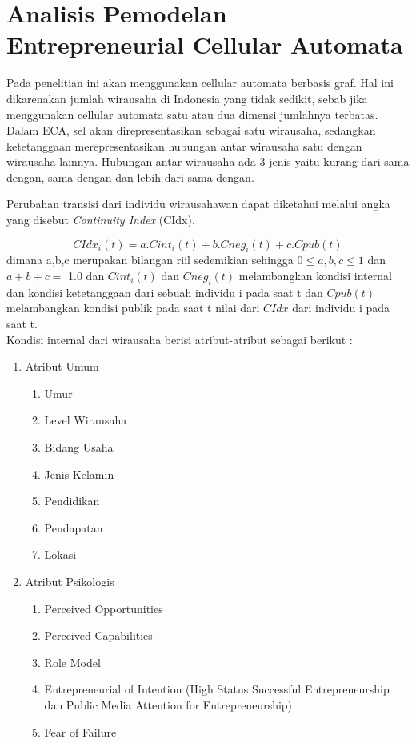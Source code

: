 \section{Analisis Pemodelan Entrepreneurial Cellular Automata}
\label{analisisCA}
Pada penelitian ini akan menggunakan cellular automata berbasis graf. Hal ini dikarenakan jumlah wirausaha di Indonesia yang tidak sedikit, sebab jika menggunakan cellular automata satu atau dua dimensi jumlahnya terbatas.\\
Dalam ECA, sel akan direpresentasikan sebagai satu wirausaha, sedangkan ketetanggaan merepresentasikan hubungan antar wirausaha satu dengan wirausaha lainnya. Hubungan antar wirausaha ada 3 jenis yaitu kurang dari sama dengan, sama dengan dan lebih dari sama dengan.


Perubahan transisi dari individu wirausahawan dapat diketahui melalui angka yang disebut \textit{Continuity Index} (CIdx).

\begin{displaymath}
\label{RumusCIDx}
	CIdx_{i}(t) = a.Cint_{i}(t) + b.Cneg_{i}(t) + c.Cpub(t)
\end{displaymath}
dimana a,b,c merupakan bilangan riil sedemikian sehingga $0\leq a,b,c \leq 1$ dan $a+b+c=$ 1.0 dan $Cint_{i}(t)$ dan $Cneg_{i}(t)$ melambangkan kondisi internal dan kondisi ketetanggaan dari sebuah individu i pada saat t dan $Cpub(t)$ melambangkan kondisi publik pada saat t nilai dari $CIdx$ dari individu i pada saat t.\\
Kondisi internal dari wirausaha berisi atribut-atribut sebagai berikut :
\begin{enumerate}
	\item Atribut Umum
		\begin{enumerate}
			\item Umur
			\item Level Wirausaha
			\item Bidang Usaha
			\item Jenis Kelamin
			\item Pendidikan
			\item Pendapatan
			\item Lokasi
		\end{enumerate}
	\item Atribut Psikologis
		 \begin{enumerate}
			\item Perceived Opportunities
			\item Perceived Capabilities
			\item Role Model
			\item Entrepreneurial of Intention (High Status Successful Entrepreneurship dan Public Media Attention for Entrepreneurship)
			\item Fear of Failure
		 \end{enumerate}
		\end{enumerate}
		
